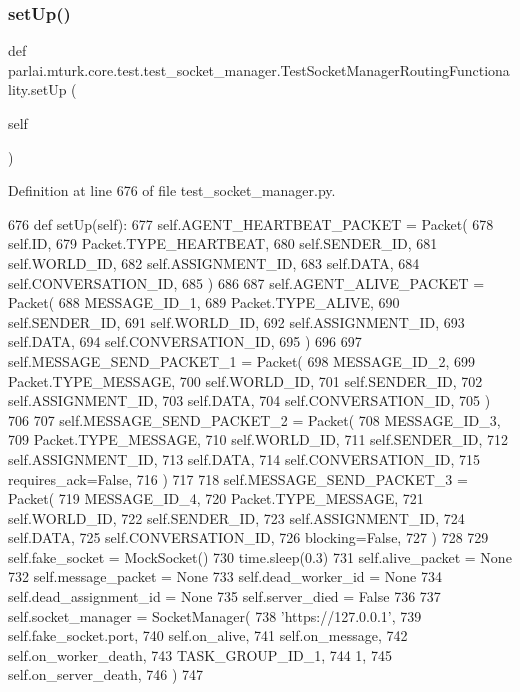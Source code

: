 \subsubsection{\texorpdfstring{set\+Up()}{setUp()}}
{\footnotesize\ttfamily def parlai.\+mturk.\+core.\+test.\+test\+\_\+socket\+\_\+manager.\+Test\+Socket\+Manager\+Routing\+Functionality.\+set\+Up (\begin{DoxyParamCaption}\item[{}]{self }\end{DoxyParamCaption})}



Definition at line 676 of file test\+\_\+socket\+\_\+manager.\+py.


\begin{DoxyCode}
676     \textcolor{keyword}{def }setUp(self):
677         self.AGENT\_HEARTBEAT\_PACKET = Packet(
678             self.ID,
679             Packet.TYPE\_HEARTBEAT,
680             self.SENDER\_ID,
681             self.WORLD\_ID,
682             self.ASSIGNMENT\_ID,
683             self.DATA,
684             self.CONVERSATION\_ID,
685         )
686 
687         self.AGENT\_ALIVE\_PACKET = Packet(
688             MESSAGE\_ID\_1,
689             Packet.TYPE\_ALIVE,
690             self.SENDER\_ID,
691             self.WORLD\_ID,
692             self.ASSIGNMENT\_ID,
693             self.DATA,
694             self.CONVERSATION\_ID,
695         )
696 
697         self.MESSAGE\_SEND\_PACKET\_1 = Packet(
698             MESSAGE\_ID\_2,
699             Packet.TYPE\_MESSAGE,
700             self.WORLD\_ID,
701             self.SENDER\_ID,
702             self.ASSIGNMENT\_ID,
703             self.DATA,
704             self.CONVERSATION\_ID,
705         )
706 
707         self.MESSAGE\_SEND\_PACKET\_2 = Packet(
708             MESSAGE\_ID\_3,
709             Packet.TYPE\_MESSAGE,
710             self.WORLD\_ID,
711             self.SENDER\_ID,
712             self.ASSIGNMENT\_ID,
713             self.DATA,
714             self.CONVERSATION\_ID,
715             requires\_ack=\textcolor{keyword}{False},
716         )
717 
718         self.MESSAGE\_SEND\_PACKET\_3 = Packet(
719             MESSAGE\_ID\_4,
720             Packet.TYPE\_MESSAGE,
721             self.WORLD\_ID,
722             self.SENDER\_ID,
723             self.ASSIGNMENT\_ID,
724             self.DATA,
725             self.CONVERSATION\_ID,
726             blocking=\textcolor{keyword}{False},
727         )
728 
729         self.fake\_socket = MockSocket()
730         time.sleep(0.3)
731         self.alive\_packet = \textcolor{keywordtype}{None}
732         self.message\_packet = \textcolor{keywordtype}{None}
733         self.dead\_worker\_id = \textcolor{keywordtype}{None}
734         self.dead\_assignment\_id = \textcolor{keywordtype}{None}
735         self.server\_died = \textcolor{keyword}{False}
736 
737         self.socket\_manager = SocketManager(
738             \textcolor{stringliteral}{'https://127.0.0.1'},
739             self.fake\_socket.port,
740             self.on\_alive,
741             self.on\_message,
742             self.on\_worker\_death,
743             TASK\_GROUP\_ID\_1,
744             1,
745             self.on\_server\_death,
746         )
747 
\end{DoxyCode}
